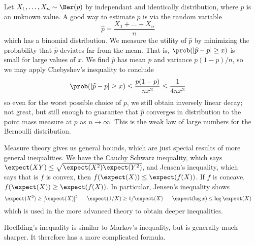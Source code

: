 \begin{example}
    Let $X_1, \dots, X_n \sim \Ber(p)$ by independant and identically distribution, where $p$ is an unknown value. A good way to estimate $p$ is via the random variable
    \[ \widehat{p} = \frac{X_1 + \dots + X_n}{n} \]
    which has a binomial distribution. We measure the utility of $\widehat{p}$ by minimizing the probability that $\widehat{p}$ deviates far from the mean. That is, $\prob(|\widehat{p} - p| \geq x)$ is small for large values of $x$. We find $\widehat{p}$ has mean $p$ and variance $p(1-p)/n$, so we may apply Chebyshev's inequality to conclude
    \[ \prob(|\widehat{p} - p| \geq x) \leq \frac{p(1-p)}{nx^2} \leq \frac{1}{4nx^2} \]
    so even for the worst possible choice of $p$, we still obtain inversely linear decay; not great, but still enough to guarantee that $\widehat{p}$ converges in distribution to the point mass measure at $p$ as $n \to \infty$. This is the weak law of large numbers for the Bernoulli distribution.
\end{example}

Measure theory gives us general bounds, which are just special results of more general inequalities. We have the Cauchy Schwarz inequality, which says $\expect(XY) \leq \sqrt{\expect(X^2) \expect(Y^2)}$, and Jensen's inequality, which says that is $f$ is convex, then $f(\expect(X)) \leq \expect(f(X))$. If $f$ is concave, $f(\expect(X)) \geq \expect(f(X))$. In particular, Jensen's inequality shows
%
\[ \expect(X^2) \geq [\expect(X)]^2\ \ \ \ \ \expect(1/X) \geq 1/\expect(X)\ \ \ \ \ \expect(\log x) \leq \log \expect(X) \]
%
which is used in the more advanced theory to obtain deeper inequalities.

Hoeffding's inequality is similar to Markov's inequality, but is generally much sharper. It therefore has a more complicated formula.


